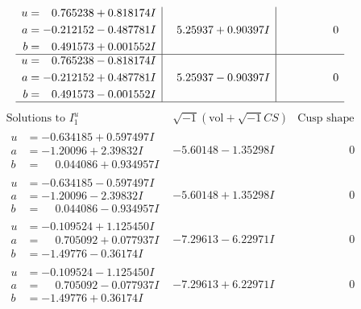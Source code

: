 \documentclass[1p]{elsarticle_modified}
\theoremstyle{definition}
\newcommand{\I}{\sqrt{-1}}
\begin{document}
$$\begin{array}{c|c|c}
\begin{aligned}
u &= \phantom{-}0.765238 + 0.818174 I \\
a &= -0.212152 - 0.487781 I \\
b &= \phantom{-}0.491573 + 0.001552 I\end{aligned}
 & \phantom{-}5.25937 + 0.90397 I & \phantom{-0.000000 } 0 \\ \hline\begin{aligned}
u &= \phantom{-}0.765238 - 0.818174 I \\
a &= -0.212152 + 0.487781 I \\
b &= \phantom{-}0.491573 - 0.001552 I\end{aligned}
 & \phantom{-}5.25937 - 0.90397 I & \phantom{-0.000000 } 0\\
 \hline 
 \end{array}$$\newpage$$\begin{array}{c|c|c}  
\text{Solutions to }I^u_{1}& \I (\text{vol} + \sqrt{-1}CS) & \text{Cusp shape}\\
 \hline 
\begin{aligned}
u &= -0.634185 + 0.597497 I \\
a &= -1.20096 + 2.39832 I \\
b &= \phantom{-}0.044086 + 0.934957 I\end{aligned}
 & -5.60148 - 1.35298 I & \phantom{-0.000000 } 0 \\ \hline\begin{aligned}
u &= -0.634185 - 0.597497 I \\
a &= -1.20096 - 2.39832 I \\
b &= \phantom{-}0.044086 - 0.934957 I\end{aligned}
 & -5.60148 + 1.35298 I & \phantom{-0.000000 } 0 \\ \hline\begin{aligned}
u &= -0.109524 + 1.125450 I \\
a &= \phantom{-}0.705092 + 0.077937 I \\
b &= -1.49776 - 0.36174 I\end{aligned}
 & -7.29613 - 6.22971 I & \phantom{-0.000000 } 0 \\ \hline\begin{aligned}
u &= -0.109524 - 1.125450 I \\
a &= \phantom{-}0.705092 - 0.077937 I \\
b &= -1.49776 + 0.36174 I\end{aligned}
 & -7.29613 + 6.22971 I & \phantom{-0.000000 } 0 \\ \hline\begin{aligned}

\end{aligned}
\end{array}$$
\end{document}
